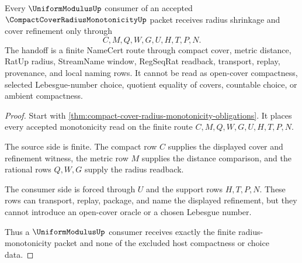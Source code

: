 \begin{theorem}
\label{thm:compact-cover-radius-monotonicity-consumer-handoff}
Every $\UniformModulusUp$ consumer of an accepted $\CompactCoverRadiusMonotonicityUp$ packet receives radius shrinkage and cover refinement only through
$$
C,M,Q,W,G,U,H,T,P,N.
$$
The handoff is a finite NameCert route through compact cover, metric distance, RatUp radius, StreamName window, RegSeqRat readback, transport, replay, provenance, and local naming rows. It cannot be read as open-cover compactness, selected Lebesgue-number choice, quotient equality of covers, countable choice, or ambient compactness.
\end{theorem}
\begin{proof}
Start with \autoref{thm:compact-cover-radius-monotonicity-obligations}. It places every accepted monotonicity read on the finite route $C,M,Q,W,G,U,H,T,P,N$.

The source side is finite. The compact row $C$ supplies the displayed cover and refinement witness, the metric row $M$ supplies the distance comparison, and the rational rows $Q,W,G$ supply the radius readback.

The consumer side is forced through $U$ and the support rows $H,T,P,N$. These rows can transport, replay, package, and name the displayed refinement, but they cannot introduce an open-cover oracle or a chosen Lebesgue number.

Thus a $\UniformModulusUp$ consumer receives exactly the finite radius-monotonicity packet and none of the excluded host compactness or choice data.
\end{proof}

\begin{closurestatus}{\CompactCoverRadiusMonotonicityUp}
  \theoryclosure{\seedClosure}
  \formalstatus{\unformalizedV}
\end{closurestatus}
